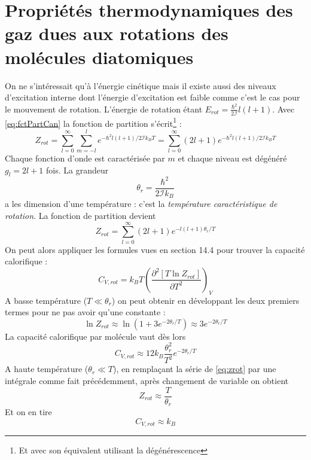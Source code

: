 \documentclass	[11pt, a4paper, openany]{book}
\begin{document}
\section{Propriétés thermodynamiques des gaz dues aux rotations des molécules diatomiques}
On ne s'intéressait qu'à l'énergie cinétique mais il existe aussi des niveaux d'excitation 
interne dont l'énergie d'excitation est faible comme c'est le cas pour le mouvement de 
rotation. L'énergie de rotation étant $E_{rot} = \frac{\hbar^2}{2\mathcal{I}}l(l+1)$. Avec
\autoref{eq:fctPartCan} la fonction de partition s'écrit\footnote{Et avec son équivalent 
utilisant la dégénérescence} :
\begin{equation}
Z_{rot} = \sum_{l=0}^\infty\sum_{m=-l}^l e^{-\hbar^2l(l+1)/2\mathcal{I}k_BT} = \sum_{
l=0}^\infty (2l+1)e^{-\hbar^2l(l+1)/2\mathcal{I}k_BT}
\end{equation}
Chaque fonction d'onde est caractérisée par $m$ et chaque niveau est dégénéré $g_l = 2l
+1$ fois. La grandeur
\begin{equation}
\theta_r = \frac{\hbar^2}{2\mathcal{I}k_B}
\end{equation}
a les dimension d'une température : c'est la \textit{température caractéristique de 
rotation}. La fonction de partition devient 
\begin{equation}
Z_{rot} = \sum_{l=0}^\infty (2l+1)e^{-l(l+1)\theta_r/T}
\label{eq:zrot}
\end{equation}
On peut alors appliquer les formules vues en section 14.4 pour trouver la capacité 
calorifique :
\begin{equation}
C_{V,rot} = k_BT\left(\dfrac{\partial^2[T\ln Z_{rot}]}{\partial T^2}\right)_V
\end{equation}
A basse température ($T \ll \theta_r$) on peut obtenir en développant les deux premiers
termes pour ne pas avoir qu'une constante :
\begin{equation}
\ln Z_{rot} \approx \ln(1+3e^{-2\theta_r/T}) \approx 3e^{-2\theta_r/T}
\end{equation}
La capacité calorifique par molécule vaut dès lors
\begin{equation}
C_{V,rot} \approx 12 k_B \frac{\theta_r^2}{T^2}e^{-2\theta_r/T}
\end{equation}
A haute température ($\theta_r \ll T$), en remplaçant la série de \autoref{eq:zrot} par 
une intégrale comme fait précédemment, après changement de variable on obtient
\begin{equation}
Z_{rot} \approx \frac{T}{\theta_r}
\end{equation}
Et on en tire
\begin{equation}
C_{V,rot} \approx k_B
\end{equation}
\end{document}
